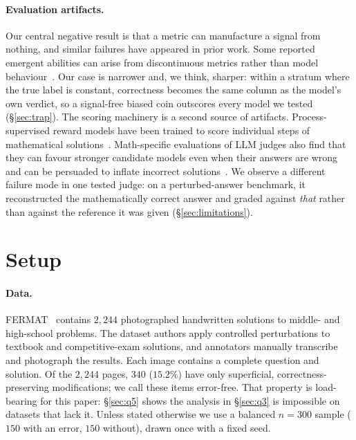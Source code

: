 \documentclass[10pt,twocolumn,letterpaper]{article}
\begin{document}
\paragraph{Evaluation artifacts.}
Our central negative result is that a metric can manufacture a signal
from nothing, and similar failures have appeared in prior work.
Some reported emergent abilities can arise from discontinuous metrics
rather than model behaviour~\cite{mirage}. Our case is narrower and, we think,
sharper: within a stratum where the true label is constant, correctness
becomes the same column as the model's own verdict, so a signal-free
biased coin outscores every model we tested (\S\ref{sec:trap}). The
scoring machinery is a second source of artifacts. Process-supervised
reward models have been trained to score individual steps of mathematical
solutions~\cite{verifystepbystep}. Math-specific evaluations of LLM judges
also find that they can favour stronger candidate models even when their
answers are wrong and can be persuaded to inflate incorrect
solutions~\cite{mathllmjudges,trickthegrader}. We observe a different
failure mode in one tested judge: on a perturbed-answer benchmark, it
reconstructed the mathematically correct answer and graded against
\emph{that} rather than against the reference it was given
(\S\ref{sec:limitations}).

\section{Setup}
\label{sec:setup}

\paragraph{Data.}
FERMAT~\cite{fermat} contains $2{,}244$ photographed handwritten
solutions to middle- and high-school problems. The dataset authors apply
controlled perturbations to textbook and competitive-exam solutions, and
annotators manually transcribe and photograph the results. Each image
contains a complete question and solution. Of the $2{,}244$ pages, $340$
($15.2\%$) have only superficial, correctness-preserving modifications;
we call these items error-free. That property is load-bearing for this
paper:
\S\ref{sec:q5} shows the analysis in \S\ref{sec:q3} is impossible on
datasets that lack it. Unless stated otherwise we use a balanced $n=300$
sample ($150$ with an error, $150$ without), drawn once with a fixed seed.
\end{document}
